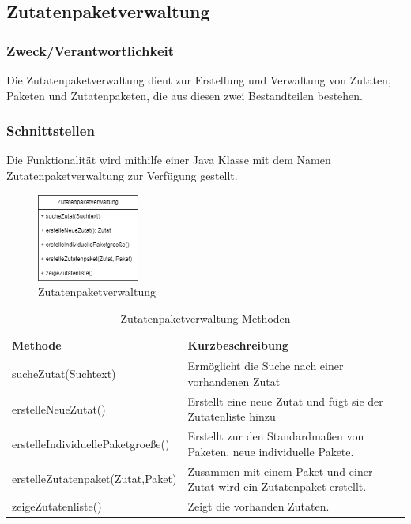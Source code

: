 \subsection{Zutatenpaketverwaltung}\label{subsec:zutatenpaketverwaltung}

\subsubsection{Zweck/Verantwortlichkeit}
Die Zutatenpaketverwaltung dient zur Erstellung und Verwaltung von Zutaten, Paketen und Zutatenpaketen, die aus
diesen zwei Bestandteilen bestehen.
\subsubsection{Schnittstellen}
Die Funktionalität wird mithilfe einer Java Klasse mit dem Namen Zutatenpaketverwaltung zur Verfügung gestellt.

\begin{figure}[H]
    \centering
    \includegraphics[width=0.3\textwidth]{Bilder/Kapitel/Bausteinsicht/Zutatenpaketverwaltung}
    \caption{Zutatenpaketverwaltung}
    \label{fig:Zutatenpaketverwaltung}
\end{figure}

\begin{table}[h]
    \centering
    \begin{tabularx}{\textwidth}{ l|X }
        \textbf{Methode} & \textbf{Kurzbeschreibung}\\
        \hline
        sucheZutat(Suchtext) & Ermöglicht die Suche nach einer vorhandenen Zutat\\
        \hline
        erstelleNeueZutat() & Erstellt eine neue Zutat und fügt sie der Zutatenliste hinzu\\
        \hline
        erstelleIndividuellePaketgroeße() & Erstellt zur den Standardmaßen von Paketen, neue individuelle Pakete.\\
        \hline
        erstelleZutatenpaket(Zutat,Paket) & Zusammen mit einem Paket und einer Zutat wird ein Zutatenpaket erstellt.\\
        \hline
        zeigeZutatenliste() & Zeigt die vorhanden Zutaten.\\
    \end{tabularx}
    \caption{Zutatenpaketverwaltung Methoden}
    \label{tab:Zutatenpaketverwaltung_Methoden}
\end{table}

